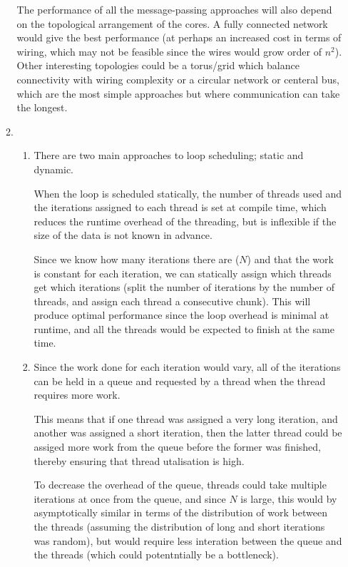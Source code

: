 \documentclass{report}
\begin{document}
\begin{enumerate}
\begin{enumerate}
    The performance of all the message-passing approaches will also
    depend on the topological arrangement of the cores. A fully
    connected network would give the best performance (at perhaps an
    increased cost in terms of wiring, which may not be feasible since
    the wires would grow order of $n^2$). Other interesting topologies
    could be a torus/grid which balance connectivity with wiring
    complexity or a circular network or centeral bus, which are the
    most simple approaches but where communication can take the
    longest.
  \item \begin{enumerate}
    \item There are two main approaches to loop scheduling; static and
      dynamic.

      When the loop is scheduled statically, the number of threads
      used and the iterations assigned to each thread is set at
      compile time, which reduces the runtime overhead of the
      threading, but is inflexible if the size of the data is not
      known in advance.

      Since we know how many iterations there are ($N$) and that the
      work is constant for each iteration, we can statically assign
      which threads get which iterations (split the number of
      iterations by the number of threads, and assign each thread a
      consecutive chunk). This will produce optimal performance since
      the loop overhead is minimal at runtime, and all the threads
      would be expected to finish at the same time.
    \item Since the work done for each iteration would vary, all of
      the iterations can be held in a queue and requested by a thread
      when the thread requires more work.

      This means that if one thread was assigned a very long
      iteration, and another was assigned a short iteration, then the
      latter thread could be assiged more work from the queue before
      the former was finished, thereby ensuring that thread
      utalisation is high.

      To decrease the overhead of the queue, threads could take
      multiple iterations at once from the queue, and since $N$ is
      large, this would by asymptotically similar in terms of the
      distribution of work between the threads (assuming the
      distribution of long and short iterations was random), but would
      require less interation between the queue and the threads (which
      could potentntially be a bottleneck).


\end{enumerate}
\end{enumerate}
\end{enumerate}
\end{document}
